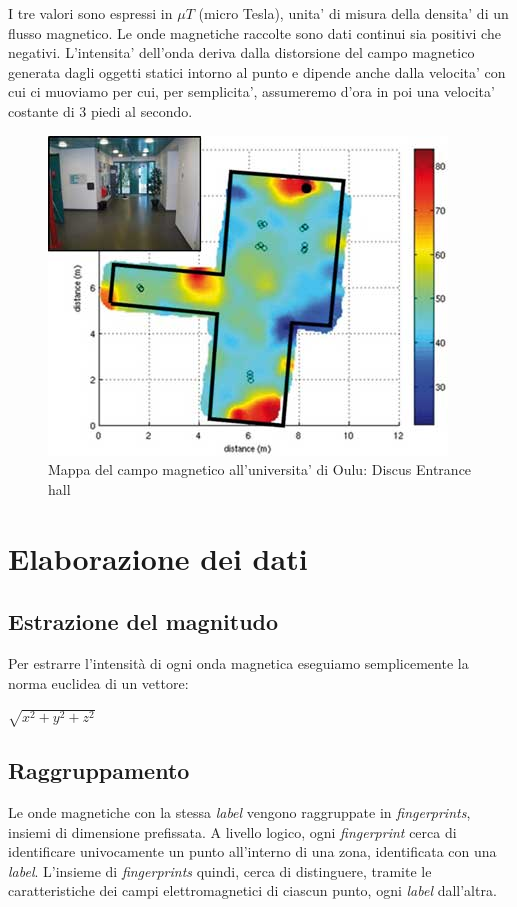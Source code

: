 I tre valori sono espressi in $ \mu T $ (micro Tesla), unita' di misura della densita' di un flusso magnetico.
Le onde magnetiche raccolte sono dati continui sia positivi che negativi. L'intensita' dell'onda deriva dalla distorsione del campo magnetico generata dagli oggetti statici intorno al punto e dipende anche dalla velocita' con cui ci muoviamo per cui, per semplicita', assumeremo d'ora in poi una velocita' costante di 3 piedi al secondo.

\begin{figure}[H]
	\centering
	\includegraphics[width=0.7\linewidth]{img/magnetic_field_map}
	\caption[Un esempio di mappa del campo magnetico]{Mappa del campo magnetico all'universita' di Oulu: Discus Entrance hall}
	\label{fig:magneticfieldmap}
\end{figure}

\section{Elaborazione dei dati}
\subsection{Estrazione del magnitudo}
Per estrarre l'intensit\`{a} di ogni onda magnetica eseguiamo semplicemente la norma euclidea di un vettore:\\
\begin{center}
	$ \sqrt{x^2 + y^2 + z^2}$
\end{center}

\subsection{Raggruppamento}
Le onde magnetiche con la stessa \textit{label} vengono raggruppate in \textit{fingerprints}, insiemi di dimensione prefissata. A livello logico, ogni \textit{fingerprint} cerca di identificare univocamente un punto all'interno di una zona, identificata con una \textit{label}. L'insieme di \textit{fingerprints} quindi, cerca di distinguere, tramite le caratteristiche dei campi elettromagnetici di ciascun punto, ogni \textit{label} dall'altra.

